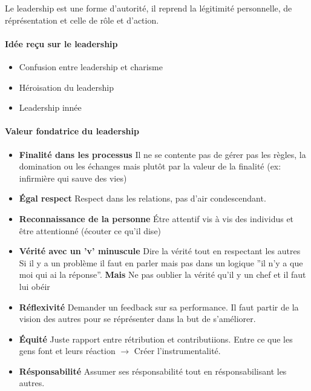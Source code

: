 \documentclass[11pt]{article} %
\begin{document}
Le leadership est une forme d'autorité, il reprend la légitimité personnelle, de
réprésentation et celle de rôle et d'action.

\paragraph{Idée reçu sur le leadership}

\begin{itemize}
    \item{Confusion entre leadership et charisme}
    \item{Héroisation du leadership}
    \item{Leadership innée}
\end{itemize}

\paragraph{Valeur fondatrice du leadership}

\begin{itemize}

    \item \textbf{Finalité dans les processus} Il ne se contente pas de gérer
    pas les règles, la domination ou les échanges mais plutôt par la
    valeur de la finalité (ex: infirmière qui sauve des vies)

    \item \textbf{Égal respect} Respect dans les relations, pas d'air
condescendant.

    \item \textbf{Reconnaissance de la personne} Étre attentif vis à vis des
    individus et être attentionné (écouter ce qu'il dise)

    \item \textbf{Vérité avec un 'v' minuscule} Dire la vérité tout en
    respectant les autres Si il y a un problème il faut en parler
    mais pas dans un logique ''il n'y a que moi qui ai la réponse''.
    \textbf{Mais} Ne pas oublier la vérité qu'il y un chef et il faut
    lui obéir

    \item \textbf{Réflexivité} Demander un feedback sur sa performance. Il
    faut partir de la vision des autres pour se réprésenter dans la
    but de s'améliorer.

    \item \textbf{Équité} Juste rapport entre rétribution et contributiions.
    Entre ce que les gens font et leurs réaction $\to$ Créer
    l'instrumentalité.

    \item \textbf{Résponsabilité} Assumer ses résponsabilité tout en
résponsabilisant les autres.

\end{itemize}
\end{document}
